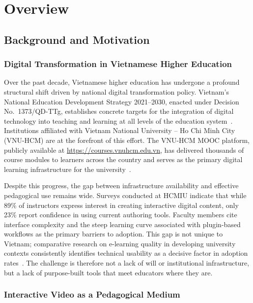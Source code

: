 \chapter{Overview}

\section{Background and Motivation}

\subsection{Digital Transformation in Vietnamese Higher Education}

Over the past decade, Vietnamese higher education has undergone a profound
structural shift driven by national digital transformation policy. Vietnam's
National Education Development Strategy 2021--2030, enacted under Decision
No.~1373/QD-TTg, establishes concrete targets for the integration of
digital technology into teaching and learning at all levels of the education
system~\cite{vietnam_strategy2021}. Institutions affiliated with Vietnam
National University -- Ho Chi Minh City (VNU-HCM) are at the forefront of
this effort. The VNU-HCM MOOC platform, publicly available at
\url{https://courses.vnuhcm.edu.vn}, has delivered thousands of course
modules to learners across the country and serves as the primary digital
learning infrastructure for the university~\cite{vnuhcm_mooc}.

Despite this progress, the gap between infrastructure availability and
effective pedagogical use remains wide. Surveys conducted at HCMIU indicate
that while 89\% of instructors express interest in creating interactive
digital content, only 23\% report confidence in using current authoring
tools. Faculty members cite interface complexity and the steep learning
curve associated with plugin-based workflows as the primary barriers to
adoption. This gap is not unique to Vietnam; comparative research on
e-learning quality in developing university contexts consistently identifies
technical usability as a decisive factor in adoption
rates~\cite{hadullo2017}. The challenge is therefore not a lack of will or
institutional infrastructure, but a lack of purpose-built tools that meet
educators where they are.

\subsection{Interactive Video as a Pedagogical Medium}

